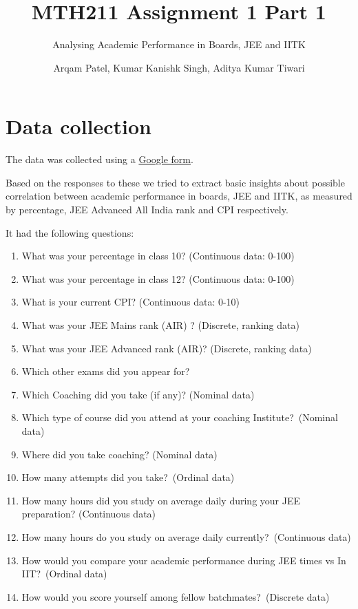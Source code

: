\documentclass[
  letterpaper,
  DIV=11,
  numbers=noendperiod]{scrartcl}
\title{MTH211 Assignment 1 Part 1}
\subtitle{Analysing Academic Performance in Boards, JEE and IITK}
\author{Arqam Patel, Kumar Kanishk Singh, Aditya Kumar Tiwari}
\date{}
\providecommand{\tightlist}{%
  \setlength{\itemsep}{0pt}\setlength{\parskip}{0pt}}\usepackage{longtable,booktabs,array}
\renewcommand*\contentsname{Table of contents}
\newcommand\contentsname{Table of contents}
\begin{document}
\maketitle
\ifdefined\Shaded\renewenvironment{Shaded}{\begin{tcolorbox}[enhanced, borderline west={3pt}{0pt}{shadecolor}, frame hidden, boxrule=0pt, breakable, interior hidden, sharp corners]}{\end{tcolorbox}}\fi

\renewcommand*\contentsname{Table of contents}
{
\hypersetup{linkcolor=}
\setcounter{tocdepth}{3}
\tableofcontents
}
\hypertarget{data-collection}{%
\section{Data collection}\label{data-collection}}

The data was collected using a
\href{https://docs.google.com/forms/d/e/1FAIpQLSed7HoFO2fe1waPy8_l55DD_4hx3z9IlTguyRA7BvAb6YVOvA/viewform}{Google
form}.

Based on the responses to these we tried to extract basic insights about
possible correlation between academic performance in boards, JEE and
IITK, as measured by percentage, JEE Advanced All India rank and CPI
respectively.

It had the following questions:

\begin{enumerate}
\def\labelenumi{\arabic{enumi}.}
\tightlist
\item
  What was your percentage in class 10? (Continuous data: 0-100)
\item
  What was your percentage in class 12? (Continuous data: 0-100)
\item
  What is your current CPI? (Continuous data: 0-10)
\item
  What was your JEE Mains rank (AIR) ? (Discrete, ranking data)
\item
  What was your JEE Advanced rank (AIR)? (Discrete, ranking data)
\item
  Which other exams did you appear for?
\item
  Which Coaching did you take (if any)? (Nominal data)
\item
  Which type of course did you attend at your coaching
  Institute?~(Nominal data)
\item
  Where did you take coaching? (Nominal data)
\item
  How many attempts did you take?~(Ordinal data)
\item
  How many hours did you study on average daily during your JEE
  preparation? (Continuous data)
\item
  How many hours do you study on average daily currently?~(Continuous
  data)
\item
  How would you compare your academic performance during JEE times vs In
  IIT?~(Ordinal data)
\item
  How would you score yourself among fellow batchmates?~(Discrete data)
\end{enumerate}
\end{document}
